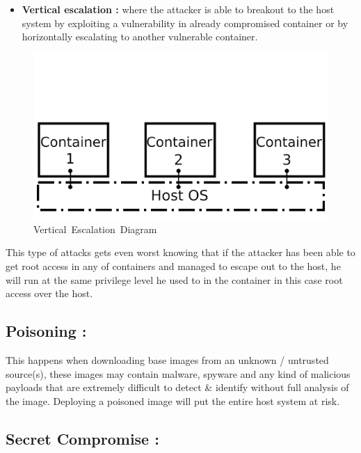 \documentclass[
  14pt,
  english,
  a4paper,
]{scrreprt}
\providecommand{\tightlist}{%
  \setlength{\itemsep}{0pt}\setlength{\parskip}{0pt}}
\begin{document}
\begin{itemize}
\tightlist
\item
  \textbf{Vertical escalation :} where the attacker is able to breakout
  to the host system by exploiting a vulnerability in already
  compromised container or by horizontally escalating to another
  vulnerable container.
\end{itemize}

\begin{figure}
\hypertarget{fig:vertesc}{%
\centering
\includegraphics[width=1\textwidth,height=\textheight]{figures/vert_esc_diagram.png}
\caption{Vertical~Escalation~Diagram}\label{fig:vertesc}
}
\end{figure}

This type of attacks gets even worst knowing that if the attacker has
been able to get root access in any of containers and managed to escape
out to the host, he will run at the same privilege level he used to in
the container in this case root access over the host.

\hypertarget{poisoning}{%
\subsection{Poisoning :}\label{poisoning}}

This happens when downloading base images from an unknown / untrusted
source(s), these images may contain malware, spyware and any kind of
malicious payloads that are extremely difficult to detect \& identify
without full analysis of the image. Deploying a poisoned image will put
the entire host system at risk.

\hypertarget{secret-compromise}{%
\subsection{Secret Compromise :}\label{secret-compromise}}
\end{document}
